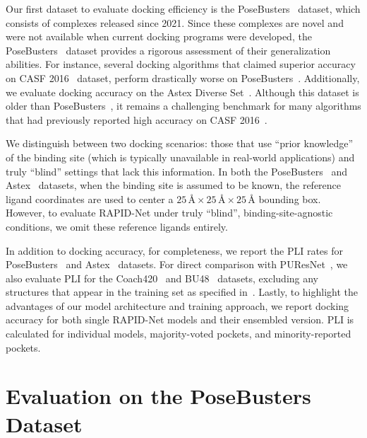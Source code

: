\documentclass[10pt,conference]{IEEEtran}
\begin{document}
Our first dataset to evaluate docking efficiency is the PoseBusters~\cite{Buttenschoen2024} dataset, which consists of complexes released since 2021. Since these complexes are novel and were not available when current docking programs were developed, the PoseBusters~\cite{Buttenschoen2024} dataset provides a rigorous assessment of their generalization abilities. For instance, several docking algorithms that claimed superior accuracy on CASF 2016~\cite{su2018comparative} dataset, perform drastically worse on PoseBusters~\cite{Buttenschoen2024}. Additionally, we evaluate docking accuracy on the Astex Diverse Set~\cite{hartshorn2007diverse}. Although this dataset is older than PoseBusters~\cite{Buttenschoen2024}, it remains a challenging benchmark for many algorithms that had previously reported high accuracy on CASF 2016~\cite{su2018comparative}.


We distinguish between two docking scenarios: those that use ``prior knowledge'' of the binding site (which is typically unavailable in real-world applications) and truly ``blind'' settings that lack this information. In both the PoseBusters~\cite{Buttenschoen2024} and Astex~\cite{hartshorn2007diverse} datasets, when the binding site is assumed to be known, the reference ligand coordinates are used to center a $25\,\text{\AA} \times 25\,\text{\AA} \times 25\,\text{\AA}$ bounding box. However, to evaluate RAPID-Net under truly ``blind'', binding-site-agnostic conditions, we omit these reference ligands entirely.


In addition to docking accuracy, for completeness, we report the PLI rates for PoseBusters~\cite{Buttenschoen2024} and Astex~\cite{hartshorn2007diverse} datasets. For direct comparison with PUResNet~\cite{kandel2021puresnet}, we also evaluate PLI for the Coach420~\cite{Roy2012} and BU48~\cite{Huang2006} datasets, excluding any structures that appear in the training set as specified in~\cite{kandel2021puresnet}. Lastly, to highlight the advantages of our model architecture and training approach, we report docking accuracy for both single RAPID-Net models and their ensembled version. PLI is calculated for individual models, majority-voted pockets, and minority-reported pockets.


\section{Evaluation on the PoseBusters Dataset}
\label{Evaluation_on_PoseBusters}
\end{document}
